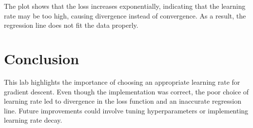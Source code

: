 \documentclass{article}
\begin{document}
The plot shows that the loss increases exponentially, indicating that the learning rate may be too high, causing divergence instead of convergence. As a result, the regression line does not fit the data properly.

\section{Conclusion}
This lab highlights the importance of choosing an appropriate learning rate for gradient descent. Even though the implementation was correct, the poor choice of learning rate led to divergence in the loss function and an inaccurate regression line. Future improvements could involve tuning hyperparameters or implementing learning rate decay.
\end{document}
